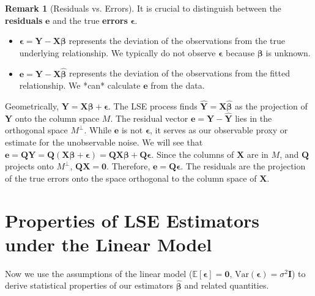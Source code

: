 \documentclass[11pt, letterpaper]{article}
\theoremstyle{definition}
\newtheorem{remark}[theorem]{Remark}
\newcommand{\E}{\mathbb{E}}
\newcommand{\Var}{\text{Var}}
\newcommand{\mat}[1]{\mathbf{#1}} %
\newcommand{\vect}[1]{\boldsymbol{#1}} %
\begin{document}
\begin{remark}[Residuals vs. Errors]
It is crucial to distinguish between the \textbf{residuals} $\vect{e}$ and the true \textbf{errors} $\vect{\epsilon}$.
\begin{itemize}
    \item $\vect{\epsilon} = \vect{Y} - \mat{X}\vect{\beta}$ represents the deviation of the observations from the true underlying relationship. We typically do not observe $\vect{\epsilon}$ because $\vect{\beta}$ is unknown.
    \item $\vect{e} = \vect{Y} - \mat{X}\hat{\vect{\beta}}$ represents the deviation of the observations from the fitted relationship. We *can* calculate $\vect{e}$ from the data.
\end{itemize}
Geometrically, $\vect{Y} = \mat{X}\vect{\beta} + \vect{\epsilon}$. The LSE process finds $\hat{\vect{Y}} = \mat{X}\hat{\vect{\beta}}$ as the projection of $\vect{Y}$ onto the column space $M$. The residual vector $\vect{e} = \vect{Y} - \hat{\vect{Y}}$ lies in the orthogonal space $M^\perp$. While $\vect{e}$ is not $\vect{\epsilon}$, it serves as our observable proxy or estimate for the unobservable noise. We will see that $\vect{e} = \mat{Q}\vect{Y} = \mat{Q}(\mat{X}\vect{\beta} + \vect{\epsilon}) = \mat{Q}\mat{X}\vect{\beta} + \mat{Q}\vect{\epsilon}$. Since the columns of $\mat{X}$ are in $M$, and $\mat{Q}$ projects onto $M^\perp$, $\mat{Q}\mat{X} = \mat{0}$. Therefore, $\vect{e} = \mat{Q}\vect{\epsilon}$. The residuals are the projection of the true errors onto the space orthogonal to the column space of $\mat{X}$.
\end{remark}

\section{Properties of LSE Estimators under the Linear Model}

Now we use the assumptions of the linear model ($\E[\vect{\epsilon}] = \vect{0}$, $\Var(\vect{\epsilon}) = \sigma^2\mat{I}$) to derive statistical properties of our estimators $\hat{\vect{\beta}}$ and related quantities.
\end{document}
